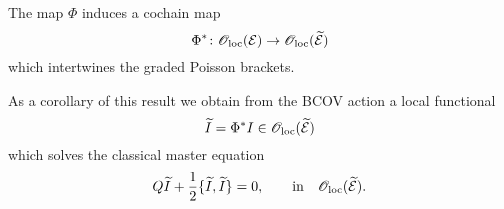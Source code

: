 \documentclass[11pt]{amsart}
\numberwithin{equation}{section}
\def\til{\Tilde}
\begin{document}
\begin{prop}
The map $\Phi$ induces a cochain map
\[
\Phi^* \colon \oloc(\cE) \to \oloc(\til \cE) 
\]
which intertwines the graded Poisson brackets. 
\end{prop}

As a corollary of this result we obtain from the BCOV action a local functional 
\[
\til I = \Phi^* I \in \oloc(\til\cE)
\] 
which solves the classical master equation
\[
Q \til I + \frac12 \{\til I, \til I\} = 0, \qquad {\rm in } \quad \oloc(\til \cE) .
\]
\end{document}
